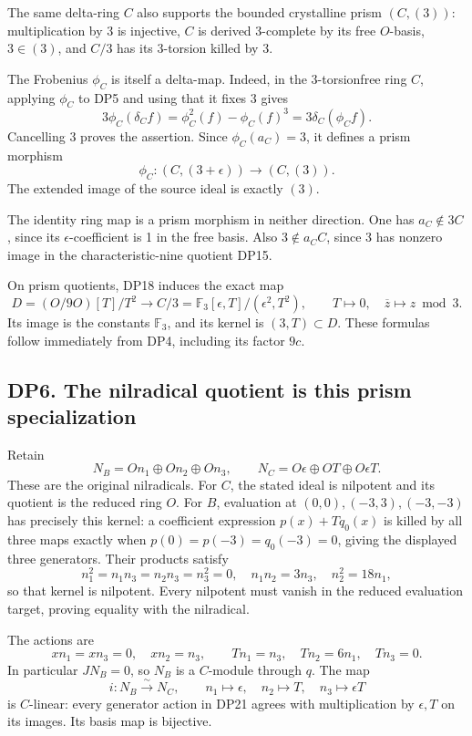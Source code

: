 \documentclass[
  10pt,
  a4paper,
]{article}
\begin{document}
The same delta-ring \(C\) also supports the bounded crystalline prism
\((C,(3))\): multiplication by 3 is injective, \(C\) is derived
3-complete by its free \(O\)-basis, \(3\in(3)\), and \(C/3\) has its
\(3\)-torsion killed by 3.

The Frobenius \(\phi_C\) is itself a delta-map. Indeed, in the
3-torsionfree ring \(C\), applying \(\phi_C\) to DP5 and using that it
fixes 3 gives \[
3\phi_C(\delta_C f)=\phi_C^2(f)-\phi_C(f)^3
=3\delta_C(\phi_C f).
\] Cancelling 3 proves the assertion. Since \(\phi_C(a_C)=3\), it
defines a prism morphism \[
\phi_C:(C,(3+\epsilon))\longrightarrow(C,(3)).
\tag{DP18}
\] The extended image of the source ideal is exactly \((3)\).

The identity ring map is a prism morphism in neither direction. One has
\(a_C\notin3C\), since its \(\epsilon\)-coefficient is 1 in the free
basis. Also \(3\notin a_CC\), since 3 has nonzero image in the
characteristic-nine quotient DP15.

On prism quotients, DP18 induces the exact map \[
D=(O/9O)[T]/T^2\longrightarrow
C/3=\mathbb F_3[\epsilon,T]/(\epsilon^2,T^2),
\qquad T\mapsto0,\quad \overline z\mapsto z\bmod3.
\tag{DP19}
\] Its image is the constants \(\mathbb F_3\), and its kernel is
\((3,T)\subset D\). These formulas follow immediately from DP4,
including its factor \(9c\).

\subsection{DP6. The nilradical quotient is this prism
specialization}\label{dp6.-the-nilradical-quotient-is-this-prism-specialization}

Retain \[
N_B=On_1\oplus On_2\oplus On_3,\qquad
N_C=O\epsilon\oplus OT\oplus O\epsilon T.
\tag{DP20}
\] These are the original nilradicals. For \(C\), the stated ideal is
nilpotent and its quotient is the reduced ring \(O\). For \(B\),
evaluation at \((0,0),(-3,3),(-3,-3)\) has precisely this kernel: a
coefficient expression \(p(x)+Tq_0(x)\) is killed by all three maps
exactly when \(p(0)=p(-3)=q_0(-3)=0\), giving the displayed three
generators. Their products satisfy \[
n_1^2=n_1n_3=n_2n_3=n_3^2=0,\quad
n_1n_2=3n_3,\quad n_2^2=18n_1,
\] so that kernel is nilpotent. Every nilpotent must vanish in the
reduced evaluation target, proving equality with the nilradical.

The actions are \[
xn_1=xn_3=0,\quad xn_2=n_3,\qquad
Tn_1=n_3,\quad Tn_2=6n_1,\quad Tn_3=0.
\tag{DP21}
\] In particular \(JN_B=0\), so \(N_B\) is a \(C\)-module through \(q\).
The map \[
i:N_B\xrightarrow{\sim}N_C,\qquad
n_1\mapsto\epsilon,\quad n_2\mapsto T,\quad n_3\mapsto\epsilon T
\tag{DP22}
\] is \(C\)-linear: every generator action in DP21 agrees with
multiplication by \(\epsilon,T\) on its images. Its basis map is
bijective.
\end{document}

